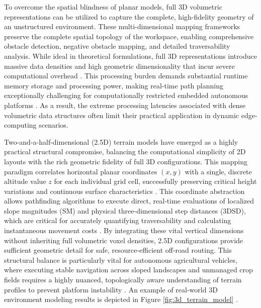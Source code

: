 To overcome the spatial blindness of planar models, full 3D volumetric representations can be
utilized to capture the complete, high-fidelity geometry of an unstructured environment. These
multi-dimensional mapping frameworks preserve the complete spatial topology of the workspace,
enabling comprehensive obstacle detection, negative obstacle mapping, and detailed traversability
analysis. While ideal in theoretical formulations, full 3D representations introduce massive data
densities and high geometric dimensionality that incur severe computational overhead \citep{Overbye_2022_localoffroad}.
This processing burden demands substantial runtime memory storage and processing power, making
real-time path planning exceptionally challenging for computationally restricted embedded autonomous
platforms \citep{Overbye_2022_localoffroad}. As a result, the extreme processing latencies associated with dense
volumetric data structures often limit their practical application in dynamic edge-computing
scenarios.

Two-and-a-half-dimensional (2.5D) terrain models have emerged as a highly practical structural
compromise, balancing the computational simplicity of 2D layouts with the rich geometric fidelity of
full 3D configurations. This mapping paradigm correlates horizontal planar coordinates $(x, y)$ with
a single, discrete altitude value $z$ for each individual grid cell, successfully preserving
critical height variations and continuous surface characteristics \citep{Xie_2020_25dnavigation, Gu_2011_rapidtraversability}. This
coordinate abstraction allows pathfinding algorithms to execute direct, real-time evaluations of
localized slope magnitudes (SM) and physical three-dimensional step distances (3DSD), which are
critical for accurately quantifying traversability and calculating instantaneous movement costs
\citep{Xie_2020_25dnavigation, Bettencourt_2025_indoor25d}. By integrating these vital vertical dimensions without inheriting full
volumetric voxel densities, 2.5D configurations provide sufficient geometric detail for safe,
resource-efficient off-road routing. This structural balance is particularly vital for autonomous
agricultural vehicles, where executing stable navigation across sloped landscapes and unmanaged crop
fields requires a highly nuanced, topologically aware understanding of terrain profiles to prevent
platform instability \citep{Hameed_2021_comprehensivereview}. An example of real-world 3D environment modeling results is depicted in Figure \ref{fig:3d_terrain_model} \citep{Lv_2024_globaloffroad}.

